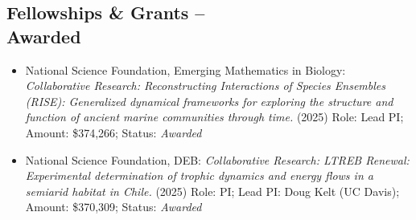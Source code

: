 \documentclass[margin,line,12pt]{res}
\begin{document}
\begin{resume}







\section{\sc Fellowships \& Grants -- \\ Awarded}
\begin{itemize}
\item National Science Foundation, Emerging Mathematics in Biology: \emph{Collaborative Research: Reconstructing Interactions of Species Ensembles (RISE): Generalized dynamical frameworks for exploring the structure and function of ancient marine communities through time.} (2025) Role: Lead PI; Amount: \$374,266; Status: \emph{Awarded}

\item National Science Foundation, DEB: \emph{Collaborative Research: LTREB Renewal: Experimental determination of trophic dynamics and energy flows in a semiarid habitat in Chile.} (2025) Role: PI; Lead PI: Doug Kelt (UC Davis); Amount: \$370,309; Status: \emph{Awarded}


\end{itemize}
\end{resume}
\end{document}
